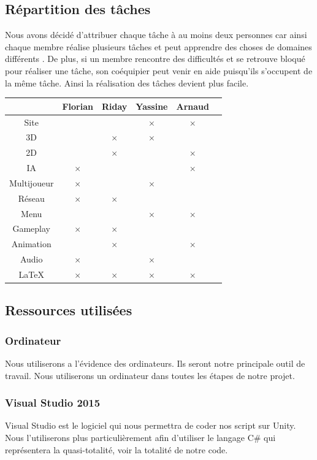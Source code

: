\documentclass[a4paper, 12pt]{article}
\begin{document}
\subsection{Répartition des tâches}
Nous avons décidé d’attribuer chaque tâche à au moins deux personnes car ainsi chaque membre réalise plusieurs tâches et peut apprendre des choses de domaines différents . De plus, si un membre rencontre des difficultés et se retrouve bloqué pour réaliser une tâche, son coéquipier peut venir en aide puisqu’ils s’occupent de la même tâche. Ainsi la réalisation des tâches devient plus facile.
\bigbreak
\bigbreak
	\begin{tabular}{|c||c|c|c|c|c|}
		\hline
		& Florian & Riday & Yassine & Arnaud \\
		\hline
		Site & & & $\times$ & $\times$\\
		\hline
		3D & & $\times$ & $\times$ &\\
		\hline
		2D & & $\times$ & & $\times$\\
		\hline
		IA & $\times$ & & & $\times$\\
		\hline
		Multijoueur & $\times$ & & $\times$ &\\
		\hline
		Réseau & $\times$ & $\times$ & & \\
		\hline
		Menu & & & $\times$ & $\times$\\
		\hline
		Gameplay & $\times$ & $\times$ & &\\
		\hline
		Animation & & $\times$ & & $\times$\\		
		\hline
		Audio & $\times$ & & $\times$ &\\
		\hline
		\LaTeX & $\times$ & $\times$ & $\times$ & $\times$\\
		\hline
	\end{tabular}
	\newpage
\subsection{Ressources utilisées}
	\subsubsection{Ordinateur}
	Nous utiliserons a l'évidence des ordinateurs. Ils seront notre principale outil de travail. Nous utiliserons un ordinateur dans toutes les étapes de notre projet. 
	\subsubsection{Visual Studio 2015}
	Visual Studio est le logiciel qui nous permettra de coder nos script sur Unity. Nous l'utiliserons plus particulièrement afin d'utiliser le langage C\# qui représentera la quasi-totalité, voir la totalité de notre code.
\end{document}
